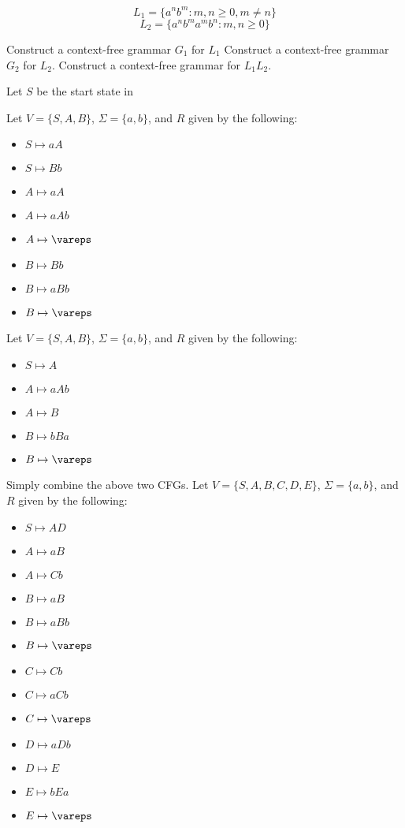 \documentclass[solution, letterpaper]{cs121}
\begin{document}
$$ L_1 = \{a^nb^m : m,n \geq 0 , m \neq n\} $$
$$ L_2 =  \{a^nb^ma^mb^n : m,n \geq 0\} $$


\subproblem Construct a context-free grammar $G_1$ for $L_1$
\subproblem Construct a context-free grammar $G_2$ for $L_2$.
\subproblem Construct a context-free grammar for $L_1L_2$.

\begin{solution}
Let $S$ be the start state in 

\subsolution Let $V = \{S, A, B\}$, $\Sigma = \{a, b\}$, and $R$ given by the following:
\begin{itemize}
	\setlength\itemsep{0pt}
	\item $S \mapsto aA$
	\item $S \mapsto Bb$
	\item $A \mapsto aA$
	\item $A \mapsto aAb$
	\item $A \mapsto \vareps$
	\item $B \mapsto Bb$
	\item $B \mapsto aBb$
	\item $B \mapsto \vareps$
\end{itemize}

\subsolution Let $V = \{S, A, B\}$, $\Sigma = \{a, b\}$, and $R$ given by the following:
\begin{itemize}
	\setlength\itemsep{0pt}
	\item $S \mapsto A$
	\item $A \mapsto aAb$
	\item $A \mapsto B$
	\item $B \mapsto bBa$
	\item $B \mapsto \vareps$
\end{itemize}

\subsolution Simply combine the above two CFGs.  Let $V = \{S, A, B, C, D, E\}$, $\Sigma = \{a, b\}$, and $R$ given by the following:
\begin{itemize}
	\setlength\itemsep{0pt}
	\item $S \mapsto AD$
	\item $A \mapsto aB$
	\item $A \mapsto Cb$
	\item $B \mapsto aB$
	\item $B \mapsto aBb$
	\item $B \mapsto \vareps$
	\item $C \mapsto Cb$
	\item $C \mapsto aCb$
	\item $C \mapsto \vareps$
	\item $D \mapsto aDb$
	\item $D \mapsto E$
	\item $E \mapsto bEa$
	\item $E \mapsto \vareps$
\end{itemize}
\end{solution}
\end{document}
